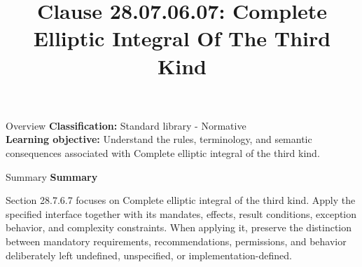 \documentclass[10pt,letterpaper]{article}
\title{Clause 28.07.06.07: Complete Elliptic Integral Of The Third Kind}
\author{}
\date{}
\begin{document}
\maketitle
\begin{CornellOverviewBox}{Overview}
\textbf{Classification:} Standard library - Normative\\[2pt]
\textbf{Learning objective:} Understand the rules, terminology, and semantic consequences associated with Complete elliptic integral of the third kind.
\end{CornellOverviewBox}\begin{CornellSummaryBox}{Summary}
{\sffamily\bfseries\color{Accent} Summary}\par\vspace{3pt}Section 28.7.6.7 focuses on Complete elliptic integral of the third kind. Apply the specified interface together with its mandates, effects, result conditions, exception behavior, and complexity constraints. When applying it, preserve the distinction between mandatory requirements, recommendations, permissions, and behavior deliberately left undefined, unspecified, or implementation-defined.
\end{CornellSummaryBox}
\end{document}
